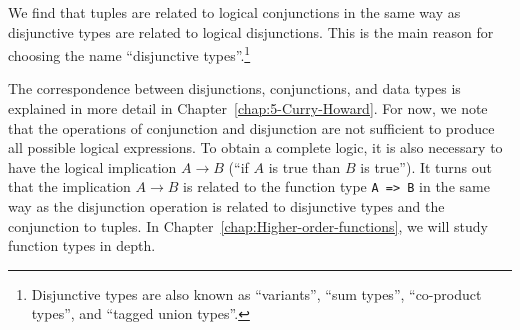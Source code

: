 We find that tuples are related to logical conjunctions in the same
way as disjunctive types are related to logical disjunctions. This
is the main reason for choosing the name \textsf{``}disjunctive types\textsf{''}.\footnote{Disjunctive types are also known as \textsf{``}variants\textsf{''}, \textsf{``}sum types\textsf{''},
\textsf{``}co-product types\textsf{''}, and \textsf{``}tagged union types\textsf{''}.}

The correspondence between disjunctions, conjunctions, and data types
is explained in more detail in Chapter~\ref{chap:5-Curry-Howard}.
For now, we note that the operations of conjunction and disjunction
are not sufficient to produce all possible logical expressions. To
obtain a complete logic, it is also necessary to have the logical
implication $A\rightarrow B$ (\textsf{``}if $A$ is true than $B$ is true\textsf{''}).
It turns out that the implication $A\rightarrow B$ is related to
the function type \lstinline!A => B! in the same way as the disjunction
operation is related to disjunctive types and the conjunction to tuples.
In Chapter~\ref{chap:Higher-order-functions}, we will study function
types in depth.
